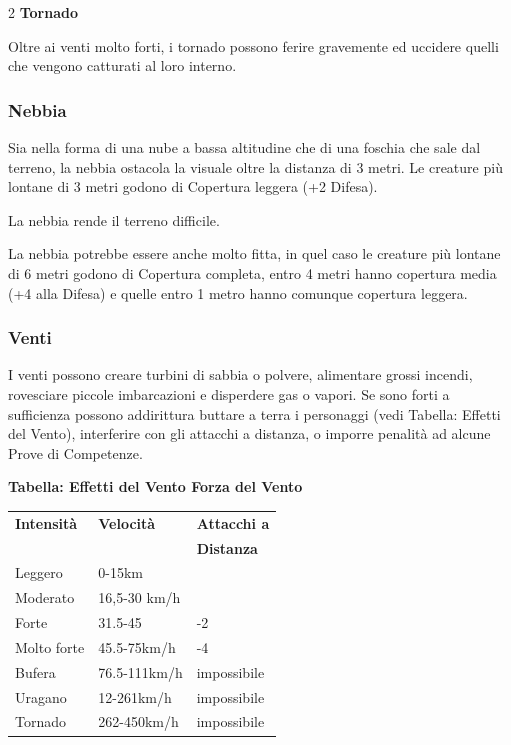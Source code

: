 \begin{multicols}{2}
\textbf{Tornado}

Oltre ai venti molto forti, i tornado possono ferire gravemente ed uccidere quelli che vengono catturati al loro interno.

\subsubsection{Nebbia}

\label{nebbia}

Sia nella forma di una nube a bassa altitudine che di una foschia che sale dal terreno, la nebbia ostacola la visuale oltre la distanza di 3 metri. Le creature più lontane di 3 metri godono di Copertura leggera (+2 Difesa).

La nebbia rende il terreno difficile.

La nebbia potrebbe essere anche molto fitta, in quel caso le creature più lontane di 6 metri godono di Copertura completa, entro 4 metri hanno copertura media (+4 alla Difesa) e quelle entro 1 metro hanno comunque copertura leggera.

\subsubsection{Venti}

\label{venti}

I venti possono creare turbini di sabbia o polvere, alimentare grossi incendi, rovesciare piccole imbarcazioni e disperdere gas o vapori. Se sono forti a sufficienza possono addirittura buttare a terra i personaggi (vedi Tabella: Effetti del Vento), interferire con gli attacchi a distanza, o imporre penalità ad alcune Prove di Competenze.

\medskip

\textbf{Tabella: Effetti del Vento Forza del Vento}

\medskip

\noindent\begin{tabularx}{\linewidth}{Xll}
	\toprule
\rowcolor{gray!20}\textbf{Intensità} & \textbf{Velocità} & \textbf{Attacchi a}\\
& & \textbf{Distanza}\\
\toprule
\rowcolor{gray!20}Leggero & 0-15km &\\
Moderato & 16,5-30 km/h& \\
\rowcolor{gray!20}Forte & 31.5-45 & -2 \\
Molto forte & 45.5-75km/h & -4 \\
\rowcolor{gray!20}Bufera & 76.5-111km/h & impossibile \\
Uragano & 12-261km/h & impossibile \\
\rowcolor{gray!20}Tornado & 262-450km/h & impossibile
\end{tabularx}


\end{multicols}

